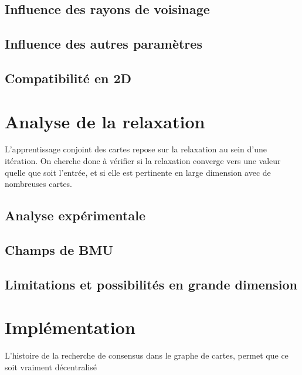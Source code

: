\subsection{Influence des rayons de voisinage}

\subsection{Influence des autres paramètres}

\subsection{Compatibilité en 2D}

\section{Analyse de la relaxation}

L'apprentissage conjoint des cartes repose sur la relaxation au sein d'une itération. On cherche donc à vérifier si la relaxation converge vers une valeur quelle que soit l'entrée, et si elle est pertinente en large dimension avec de nombreuses cartes.

\subsection{Analyse expérimentale}

\subsection{Champs de BMU}

\subsection{Limitations et possibilités en grande dimension}

\section{Implémentation}
L'histoire de la recherche de consensus dans le graphe de cartes, permet que ce soit vraiment décentralisé